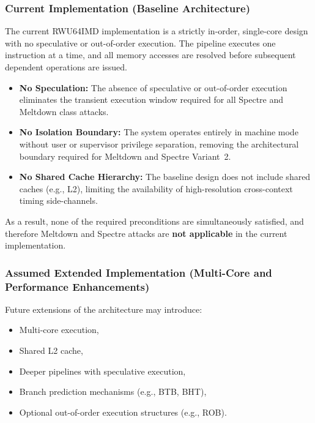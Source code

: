 \subsubsection*{Current Implementation (Baseline Architecture)}

The current RWU64IMD implementation is a strictly in-order, single-core design
with no speculative or out-of-order execution. The pipeline executes one instruction
at a time, and all memory accesses are resolved before subsequent dependent operations
are issued.

\begin{itemize}
  \item \textbf{No Speculation:} The absence of speculative or out-of-order execution
        eliminates the transient execution window required for all Spectre and Meltdown
        class attacks.
  \item \textbf{No Isolation Boundary:} The system operates entirely in machine mode
        without user or supervisor privilege separation, removing the architectural
        boundary required for Meltdown and Spectre Variant~2.
  \item \textbf{No Shared Cache Hierarchy:} The baseline design does not include
        shared caches (e.g., L2), limiting the availability of high-resolution
        cross-context timing side-channels.
\end{itemize}

As a result, none of the required preconditions are simultaneously satisfied,
and therefore Meltdown and Spectre attacks are \textbf{not applicable} in the
current implementation.

\subsubsection*{Assumed Extended Implementation (Multi-Core and Performance Enhancements)}

Future extensions of the architecture may introduce:
\begin{itemize}
  \item Multi-core execution,
  \item Shared L2 cache,
  \item Deeper pipelines with speculative execution,
  \item Branch prediction mechanisms (e.g., BTB, BHT),
  \item Optional out-of-order execution structures (e.g., ROB).
\end{itemize}

